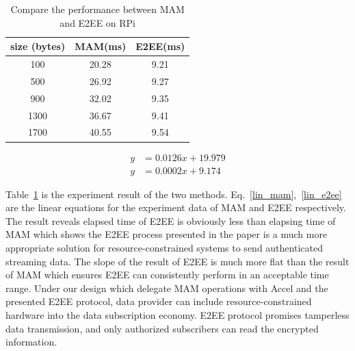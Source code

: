 \documentclass[conference]{IEEEtran}
\begin{document}
\begin{table}[htbp]
	\caption{Compare the performance between MAM and E2EE on RPi}
    \label{tab:mam_vs_e2ee}
    \centering
        \begin{tabular}{|c||c|c|}
        \hline
            \textbf{size (bytes)} & \textbf{MAM(ms)} & \textbf{E2EE(ms)} \\
            \hline
            100 & 20.28 & 9.21 \\ 
            500 &  26.92 & 9.27 \\ 
            900 & 32.02 &  9.35  \\ 
            1300 & 36.67 & 9.41 \\ 
            1700 & 40.55 & 9.54 \\
            \hline
        \end{tabular}
\end{table}

\begin{align}
    y &= 0.0126 x+19.979 \label{lin_mam} \\
    y &= 0.0002 x+9.174 \label{lin_e2ee}
\end{align}

Table~\ref{tab:mam_vs_e2ee} is the experiment result of the two methods. Eq.~\ref{lin_mam},~\ref{lin_e2ee} are the linear equations for the experiment data of MAM and E2EE respectively. The result reveals elapsed time of E2EE is obviously less than elapsing time of MAM which shows the E2EE process presented in the paper is a much more appropriate solution for resource-constrained systems to send authenticated streaming data. The slope of the result of E2EE is much more flat than the result of MAM which ensures E2EE can consistently perform in an acceptable time range. Under our design which delegate MAM operations with Accel and the presented E2EE protocol, data provider can include resource-constrained hardware into the data subscription economy. E2EE protocol promises tamperless data transmission, and only authorized subscribers can read the encrypted information.
\end{document}
